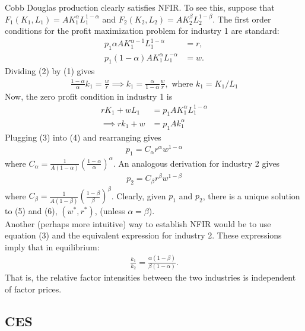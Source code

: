 \documentclass[12pt]{article}
\begin{document}
Cobb Douglas production clearly satisfies NFIR. To see this, suppose that $F_1(K_1,L_1) = AK_1^\alpha L_1^{1-\alpha}$ and $F_2(K_2,L_2) = AK_2^\beta L_2^{1-\beta}$. The first order conditions for the profit maximization problem for industry 1 are standard:
\begin{align}
p_1\alpha AK_1^{\alpha-1}L_1^{1-\alpha} &= r,\\
p_1(1-\alpha) AK_1^{\alpha}L_1^{-\alpha} &= w.
\end{align}
Dividing (2) by (1) gives
\begin{align}
\frac{1-\alpha}{\alpha} k_1 = \frac{w}{r} \implies k_1 = \frac{\alpha}{1-\alpha}\frac{w}{r}, \text{ where } k_1 = K_1/L_1 \label{eq:cd1}
\end{align}
Now, the zero profit condition in industry 1 is
\begin{align}
rK_1 + w L_1 &= p_1  AK_1^\alpha L_1^{1-\alpha} \nonumber\\
\implies r k_1 + w &= p_1 A k_1^\alpha
\end{align}
Plugging (3) into (4) and rearranging gives
\begin{align}
p_1 = C_\alpha r^\alpha w^{1-\alpha}
\end{align}
where $C_\alpha = \frac{1}{A(1-\alpha)}\left(\frac{1-\alpha}{\alpha}\right)^\alpha$. An analogous derivation for industry 2 gives
\begin{align}
p_2 = C_\beta r^\beta w^{1-\beta}
\end{align}
where $C_\beta = \frac{1}{A(1-\beta)}\left(\frac{1-\beta}{\beta}\right)^\beta$.
Clearly, given $p_1$ and $p_2$, there is a unique solution to (5) and (6), $(w^*,r^*)$, (unless $\alpha = \beta$).\\

Another (perhaps more intuitive) way to establish NFIR would be to use equation (3) and the equivalent expression for industry 2. These expressions imply that in equilibrium:
\begin{align*}
\frac{k_1}{k_2} = \frac{\alpha (1-\beta)}{\beta(1-\alpha)}.
\end{align*}
That is, the relative factor intensities between the two industries is independent of factor prices.\\


\subsection{CES}
\end{document}
